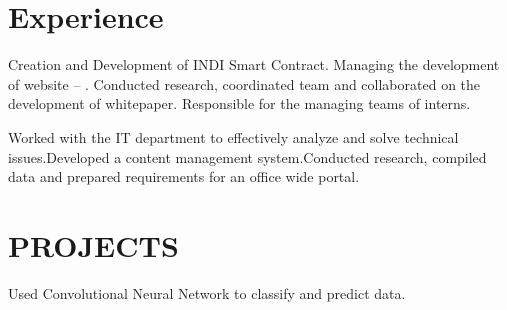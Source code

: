 \documentclass[]{vansh-resume}
\begin{document}
\hfill
\begin{minipage}[t]{0.64\textwidth} 


\section{Experience}

\vspace{\topsep} 
\begin{tightemize}
\item  Creation and Development of INDI Smart Contract. Managing the development of website – \href{https://indi.live/}{}. Conducted research, coordinated team and collaborated on the development of whitepaper. Responsible for the managing teams of interns.
\item  {}
\end{tightemize}
\sectionsep

\begin{tightemize}
\item Worked with the IT department to effectively analyze and solve technical issues.Developed a content management system.Conducted research, compiled data and prepared requirements for an office wide portal.
\item {}\end{tightemize}
\sectionsep


\section{PROJECTS}
\smallskip
\begin{tightemize}
\item Used Convolutional Neural Network to classify and predict data.
\item {}
\end{tightemize}
\sectionsep


\end{minipage}
\end{document}
